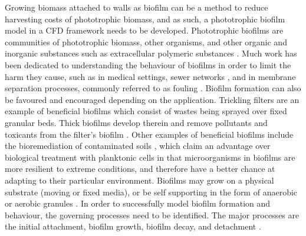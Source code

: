 Growing biomass attached to walls as biofilm can be a method to reduce harvesting costs of phototrophic biomass, and as such, a phototrophic biofilm model in a CFD framework needs to be developed. 
\skippingparagraph
Phototrophic biofilms are communities of phototrophic biomass, other organisms, and other organic and inorganic substances such as extracellular polymeric substances \cite{vanloosdrecht2002}. 
Much work has been dedicated to understanding the behaviour of biofilms in order to limit the harm they cause, such as in medical settings, sewer networks \cite{pikaar2014}, and in membrane separation processes, commonly referred to as fouling \cite{radaei2018}. Biofilm formation can also be favoured and encouraged depending on the application. 
Trickling filters are an example of beneficial biofilms which consist of wastes being sprayed over fixed granular beds. Thick biofilms develop therein and remove pollutants and toxicants from the filter's biofilm \cite{donlan2002}. Other examples of beneficial biofilms include the bioremediation of contaminated soils \cite{singh2006}, which claim an advantage over biological treatment with planktonic cells in that microorganisms in biofilms are more resilient to extreme conditions, and therefore have a better chance at adapting to their particular environment. Biofilms may grow on a physical substrate (moving or fixed media), or be self supporting in the form of anaerobic or aerobic granules \cite{baeten2018}. 
\skippingparagraph
In order to successfully model biofilm formation and behaviour, the governing processes need to be identified. The major processes are the initial attachment, biofilm growth, biofilm decay, and detachment \cite{alpkvist2007}. 
